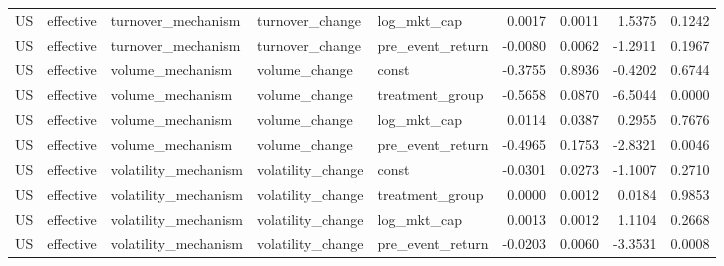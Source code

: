 \begin{tabular}{lllllrrrr}
US & effective & turnover_mechanism & turnover_change & log_mkt_cap & 0.0017 & 0.0011 & 1.5375 & 0.1242 \\
US & effective & turnover_mechanism & turnover_change & pre_event_return & -0.0080 & 0.0062 & -1.2911 & 0.1967 \\
US & effective & volume_mechanism & volume_change & const & -0.3755 & 0.8936 & -0.4202 & 0.6744 \\
US & effective & volume_mechanism & volume_change & treatment_group & -0.5658 & 0.0870 & -6.5044 & 0.0000 \\
US & effective & volume_mechanism & volume_change & log_mkt_cap & 0.0114 & 0.0387 & 0.2955 & 0.7676 \\
US & effective & volume_mechanism & volume_change & pre_event_return & -0.4965 & 0.1753 & -2.8321 & 0.0046 \\
US & effective & volatility_mechanism & volatility_change & const & -0.0301 & 0.0273 & -1.1007 & 0.2710 \\
US & effective & volatility_mechanism & volatility_change & treatment_group & 0.0000 & 0.0012 & 0.0184 & 0.9853 \\
US & effective & volatility_mechanism & volatility_change & log_mkt_cap & 0.0013 & 0.0012 & 1.1104 & 0.2668 \\
US & effective & volatility_mechanism & volatility_change & pre_event_return & -0.0203 & 0.0060 & -3.3531 & 0.0008 \\
\bottomrule
\end{tabular}
